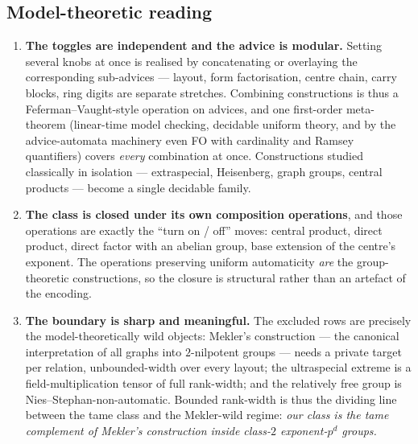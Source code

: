 \documentclass[11pt,a4paper]{article}
\theoremstyle{plain}
\theoremstyle{definition}
\begin{document}
\subsection*{Model-theoretic reading}

\begin{enumerate}
\item \textbf{The toggles are independent and the advice is modular.}
Setting several knobs at once is realised by concatenating or overlaying
the corresponding sub-advices --- layout, form factorisation, centre
chain, carry blocks, ring digits are separate stretches. Combining
constructions is thus a Feferman--Vaught-style operation on advices, and
one first-order meta-theorem (linear-time model checking, decidable uniform
theory, and by the advice-automata machinery even FO with cardinality and
Ramsey quantifiers) covers \emph{every} combination at once. Constructions
studied classically in isolation --- extraspecial, Heisenberg, graph
groups, central products --- become a single decidable family.

\item \textbf{The class is closed under its own composition operations},
and those operations are exactly the ``turn on / off'' moves: central
product, direct product, direct factor with an abelian group, base
extension of the centre's exponent. The operations preserving uniform
automaticity \emph{are} the group-theoretic constructions, so the closure
is structural rather than an artefact of the encoding.

\item \textbf{The boundary is sharp and meaningful.} The excluded rows are
precisely the model-theoretically wild objects: Mekler's construction ---
the canonical interpretation of all graphs into $2$-nilpotent groups ---
needs a private target per relation, unbounded-width over every layout; the
ultraspecial extreme is a field-multiplication tensor of full rank-width;
and the relatively free group is Nies--Stephan-non-automatic. Bounded
rank-width is thus the dividing line between the tame class and the
Mekler-wild regime: \emph{our class is the tame complement of Mekler's
construction inside class-$2$ exponent-$p^{d}$ groups.}
\end{enumerate}
\end{document}
